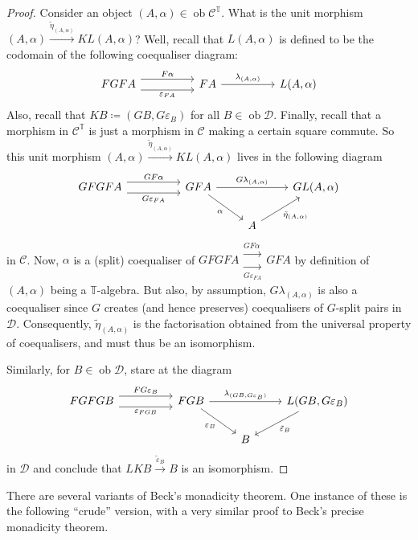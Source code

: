 \documentclass[a4paper,11pt]{article}
\theoremstyle{break_italics}
\theoremstyle{break_upright}
\theoremstyle{remark}
\newcommand{\ob}{\operatorname{ob}}
\newcommand{\C}{\mathcal{C}}
\newcommand{\D}{\mathcal{D}}
\begin{document}
\begin{proof}
Consider an object $(A,\alpha) \in \ob\C^{\mathbb T}$. What is the unit morphism $(A,\alpha) \xrightarrow{\tilde\eta_{(A,\alpha)}} KL(A,\alpha)$? Well, recall that $L(A,\alpha)$ is defined to be the codomain of the following coequaliser diagram:
			\[
\begin{tikzcd}
FGFA \arrow[rr, "F\alpha", shift left=2] \arrow[rr, "\varepsilon_{FA}"', shift right=2] &  & FA \arrow[rr, "{\lambda_{(A,\alpha)}}"] &  & {L(A,\alpha)}
\end{tikzcd}
			\]
	Also, recall that $KB \coloneqq (GB, G\varepsilon_B)$ for all $B \in \ob\D$. Finally, recall that a morphism in $\C^{\mathbb T}$ is just a morphism in $\C$ making a certain square commute. So this unit morphism $(A,\alpha) \xrightarrow{\tilde\eta_{(A,\alpha)}} KL(A,\alpha)$ lives in the following diagram
	\[
\begin{tikzcd}
GFGFA \arrow[rr, "GF\alpha", shift left=2] \arrow[rr, "G\varepsilon_{FA}"', shift right=2] &  & GFA \arrow[rr, "{G\lambda_{(A,\alpha)}}"] \arrow[rd, "\alpha"'] & & {GL(A,\alpha)} \\ &  & & A \arrow[ru, "{\tilde\eta_{(A,\alpha)}}"']&               
\end{tikzcd}
	\]
	in $\C$. Now, $\alpha$ is a (split) coequaliser of $GFGFA \substack{\xrightarrow{ GF\alpha \ } \\ \xrightarrow[G\varepsilon_{FA}]{}} GFA$ by definition of $(A,\alpha)$ being a $\mathbb T$-algebra. But also, by assumption, $G\lambda_{(A,\alpha)}$ is also a coequaliser since $G$ creates (and hence preserves) coequalisers of $G$-split pairs in $\D$. Consequently, $\tilde \eta_{(A,\alpha)}$ is the factorisation obtained from the universal property of coequalisers, and must thus be an isomorphism.

	Similarly, for $B \in \ob\D$, stare at the diagram
	\[
\begin{tikzcd}
FGFGB \arrow[rr, "FG\varepsilon_B", shift left=2] \arrow[rr, "\varepsilon_{FGB}"', shift right=2] &  & FGB \arrow[rr, "{\lambda_{(GB,G\varepsilon_B)}}"] \arrow[rd, "\varepsilon_B"'] &   & {L(GB,G\varepsilon_B)} \arrow[ld, "\tilde \varepsilon_B"] \\& &                                                                              & B &                                                          
\end{tikzcd}
	\]
	in $\D$ and conclude that $LKB \xrightarrow{\tilde \varepsilon_B} B$ is an isomorphism.
\end{proof}


There are several variants of Beck's monadicity theorem. One instance of these is the following ``crude'' version, with a very similar proof to Beck's precise monadicity theorem.
\end{document}
